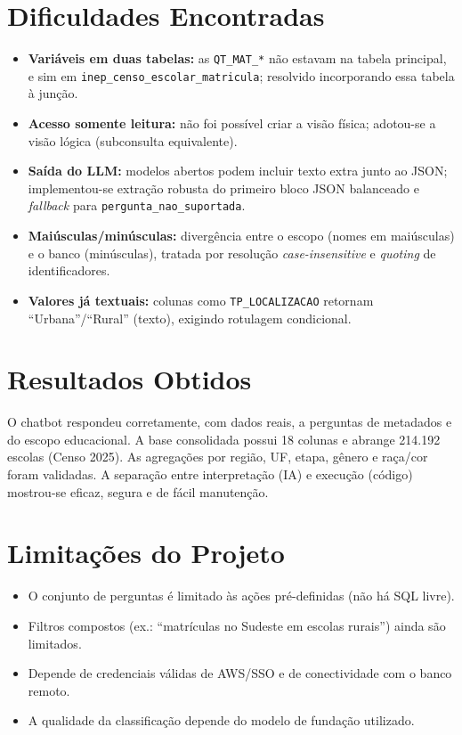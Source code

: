 \documentclass[
    12pt,
    oneside,
    a4paper,
    chapter=TITLE,
    section=TITLE
]{abntex2}
\begin{document}
\section{Dificuldades Encontradas}
\begin{itemize}[itemsep=2pt]
  \item \textbf{Variáveis em duas tabelas:} as \texttt{QT\_MAT\_*} não estavam na tabela principal,
        e sim em \texttt{inep\_censo\_escolar\_matricula}; resolvido incorporando essa tabela à junção.
  \item \textbf{Acesso somente leitura:} não foi possível criar a visão física; adotou-se a visão
        lógica (subconsulta equivalente).
  \item \textbf{Saída do LLM:} modelos abertos podem incluir texto extra junto ao JSON; implementou-se
        extração robusta do primeiro bloco JSON balanceado e \textit{fallback} para
        \texttt{pergunta\_nao\_suportada}.
  \item \textbf{Maiúsculas/minúsculas:} divergência entre o escopo (nomes em maiúsculas) e o banco
        (minúsculas), tratada por resolução \textit{case-insensitive} e \textit{quoting} de identificadores.
  \item \textbf{Valores já textuais:} colunas como \texttt{TP\_LOCALIZACAO} retornam ``Urbana''/``Rural''
        (texto), exigindo rotulagem condicional.
\end{itemize}

\section{Resultados Obtidos}
O chatbot respondeu corretamente, com dados reais, a perguntas de metadados e do escopo educacional.
A base consolidada possui 18 colunas e abrange 214.192 escolas (Censo 2025). As agregações por
região, UF, etapa, gênero e raça/cor foram validadas. A separação entre interpretação (IA) e
execução (código) mostrou-se eficaz, segura e de fácil manutenção.

\section{Limitações do Projeto}
\begin{itemize}[itemsep=1pt]
  \item O conjunto de perguntas é limitado às ações pré-definidas (não há SQL livre).
  \item Filtros compostos (ex.: ``matrículas no Sudeste em escolas rurais'') ainda são limitados.
  \item Depende de credenciais válidas de AWS/SSO e de conectividade com o banco remoto.
  \item A qualidade da classificação depende do modelo de fundação utilizado.
\end{itemize}
\end{document}
